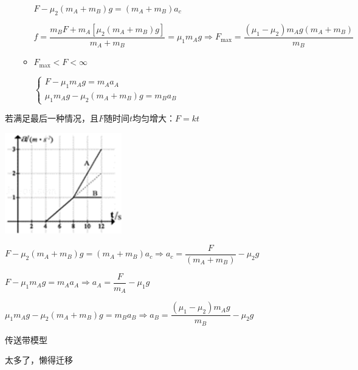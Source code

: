\begin{problemset}
\begin{itemize}
\begin{itemize}
				$F-\mu_{2}\left(m_{A}+m_{B}\right) g=\left(m_{A}+m_{B}\right) a_{c}$
				
				$f=\dfrac{m_{B} F+m_{A}\left[\mu_{2}\left(m_{A}+m_{B}\right) g\right]}{m_{A}+m_{B}}=\mu_{1} m_{A} g \Rightarrow F_{\max }=\dfrac{\left(\mu_{1}-\mu_{2}\right) m_{A} g\left(m_{A}+m_{B}\right)}{m_{B}}$
			\item $F_{\max }<F<\infty$
				
				$\left\{\begin{array}{c}F-\mu_{1} m_{A} g=m_{A} a_{A} \\ \mu_{1} m_{A} g-\mu_{2}\left(m_{A}+m_{B}\right) g=m_{B} a_{B}\end{array}\right.$
		\end{itemize} 
			
	\end{itemize}
	\begin{example}
		若满足最后一种情况，且$F$随时间$t$均匀增大：$F=kt$
\begin{center}
	\includegraphics[width=2in]{media/34.png}
\end{center}
	$F-\mu_{2}\left(m_{A}+m_{B}\right) g=\left(m_{A}+m_{B}\right) a_{c} \Rightarrow a_{c}=\dfrac{F}{\left(m_{A}+m_{B}\right)}-\mu_{2} g$
	
	$F-\mu_{1} m_{A} g=m_{A} a_{A} \Rightarrow a_{A}=\dfrac{F}{m_{A}}-\mu_{1} g$
	
	$\mu_{1} m_{A} g-\mu_{2}\left(m_{A}+m_{B}\right) g=m_{B} a_{B} \Rightarrow a_{B}=\dfrac{\left(\mu_{1}-\mu_{2}\right) m_{A} g}{m_{B}}-\mu_{2} g$
	\end{example}
	\newpage
	\item 传送带模型
	
	太多了，懒得迁移
\end{problemset}

